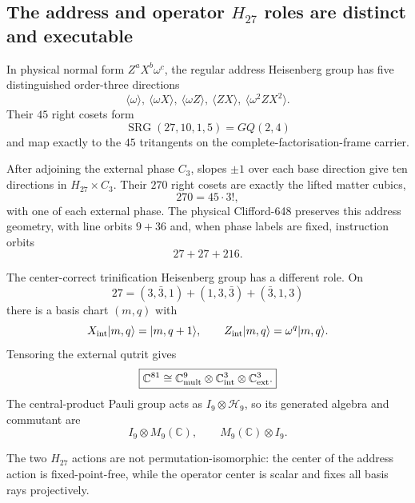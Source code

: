 \subsection*{The address and operator $H_{27}$ roles are distinct and executable}

In physical normal form $Z^aX^b\omega^c$, the regular address Heisenberg group has five distinguished order-three directions
\[
\langle\omega\rangle,\ 
\langle\omega X\rangle,\ 
\langle\omega Z\rangle,\ 
\langle ZX\rangle,\ 
\langle\omega^2ZX^2\rangle.
\]
Their $45$ right cosets form
\[
\operatorname{SRG}(27,10,1,5)=GQ(2,4)
\]
and map exactly to the $45$ tritangents on the complete-factorisation-frame carrier.

After adjoining the external phase $C_3$, slopes $\pm1$ over each base direction give ten directions in $H_{27}\times C_3$. Their $270$ right cosets are exactly the lifted matter cubics,
\[
270=45\cdot3!,
\]
with one of each external phase. The physical Clifford-648 preserves this address geometry, with line orbits $9+36$ and, when phase labels are fixed, instruction orbits
\[
27+27+216.
\]

The center-correct trinification Heisenberg group has a different role. On
\[
27=(3,\bar3,1)+(1,3,\bar3)+(\bar3,1,3)
\]
there is a basis chart $(m,q)$ with
\[
X_{\rm int}|m,q\rangle=|m,q+1\rangle,\qquad
Z_{\rm int}|m,q\rangle=\omega^q|m,q\rangle.
\]
Tensoring the external qutrit gives
\[
\boxed{\mathbb C^{81}\cong
\mathbb C^9_{\rm mult}\otimes\mathbb C^3_{\rm int}\otimes\mathbb C^3_{\rm ext}.}
\]
The central-product Pauli group acts as $I_9\otimes\mathcal H_9$, so its generated algebra and commutant are
\[
\boxed{I_9\otimes M_9(\mathbb C)},\qquad
\boxed{M_9(\mathbb C)\otimes I_9}.
\]

The two $H_{27}$ actions are not permutation-isomorphic: the center of the address action is fixed-point-free, while the operator center is scalar and fixes all basis rays projectively.
